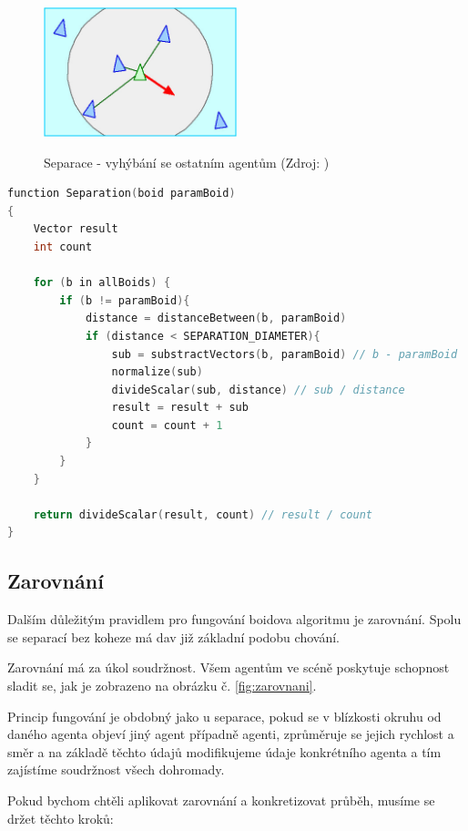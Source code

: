 \documentclass[czech,public,dept460,male,cpdeclaration]{diploma}
\begin{document}
\begin{figure}[H]\centering\includegraphics[width=0.5\textwidth]{Figures/separation.jpg}\label{fig:separationImg}
	\caption{Separace - vyhýbání se ostatním agentům (Zdroj: \cite{link2})}\label{fig:separationImg}
\end{figure}

\begin{lstlisting}[language=c++,label=src:Separation pseudocode,caption=Pseudokód pro separaci]
function Separation(boid paramBoid)
{
	Vector result
	int count
	
	for (b in allBoids) {
		if (b != paramBoid){
			distance = distanceBetween(b, paramBoid)
			if (distance < SEPARATION_DIAMETER){
				sub = substractVectors(b, paramBoid) // b - paramBoid
				normalize(sub)
				divideScalar(sub, distance) // sub / distance
				result = result + sub
				count = count + 1
			}
		}
	}
	
	return divideScalar(result, count) // result / count
}
\end{lstlisting}

\subsection{Zarovnání}\label{sec:zarovnani}
Dalším důležitým pravidlem pro fungování boidova algoritmu je zarovnání. Spolu se separací bez koheze má dav již základní podobu chování. 

Zarovnání má za úkol soudržnost. Všem agentům ve scéně poskytuje schopnost sladit se, jak je zobrazeno na obrázku č. \ref{fig:zarovnani}. 

Princip fungování je obdobný jako u separace, pokud se v blízkosti okruhu od daného agenta objeví jiný agent případně agenti, zprůměruje se jejich rychlost a směr a na základě těchto údajů modifikujeme údaje konkrétního agenta a tím zajístíme soudržnost všech dohromady. 

Pokud bychom chtěli aplikovat zarovnání a konkretizovat průběh, musíme se držet těchto kroků:
\end{document}
